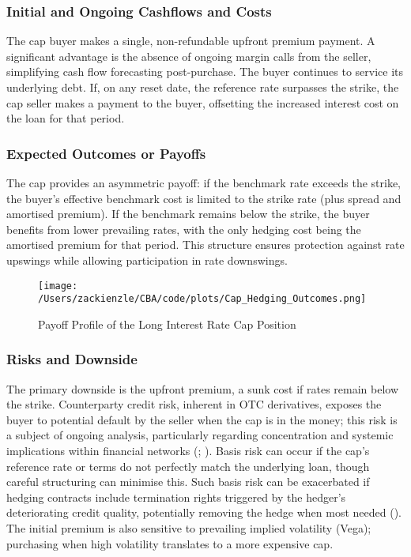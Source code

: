 \documentclass[11pt, a4paper, british]{article}
\begin{document}
\subsubsection{Initial and Ongoing Cashflows and Costs}
The cap buyer makes a single, non-refundable upfront premium payment. A significant advantage is the absence of ongoing margin calls from the seller, simplifying cash flow forecasting post-purchase. The buyer continues to service its underlying debt. If, on any reset date, the reference rate surpasses the strike, the cap seller makes a payment to the buyer, offsetting the increased interest cost on the loan for that period.

\subsubsection{Expected Outcomes or Payoffs}
The cap provides an asymmetric payoff: if the benchmark rate exceeds the strike, the buyer's effective benchmark cost is limited to the strike rate (plus spread and amortised premium). If the benchmark remains below the strike, the buyer benefits from lower prevailing rates, with the only hedging cost being the amortised premium for that period. This structure ensures protection against rate upswings while allowing participation in rate downswings.

\begin{figure}[H]
 \centering
 \texttt{[image: /Users/zackienzle/CBA/code/plots/Cap\_Hedging\_Outcomes.png]} 
 \caption{Payoff Profile of the Long Interest Rate Cap Position}
    \label{fig:LongCapsPayoff}
\end{figure}

\subsubsection{Risks and Downside}
The primary downside is the upfront premium, a sunk cost if rates remain below the strike. Counterparty credit risk, inherent in OTC derivatives, exposes the buyer to potential default by the seller when the cap is in the money; this risk is a subject of ongoing analysis, particularly regarding concentration and systemic implications within financial networks (\cite{bs}; \cite{ngs}). Basis risk can occur if the cap's reference rate or terms do not perfectly match the underlying loan, though careful structuring can minimise this. Such basis risk can be exacerbated if hedging contracts include termination rights triggered by the hedger's deteriorating credit quality, potentially removing the hedge when most needed (\cite{bt}). The initial premium is also sensitive to prevailing implied volatility (Vega); purchasing when high volatility translates to a more expensive cap.
\end{document}
